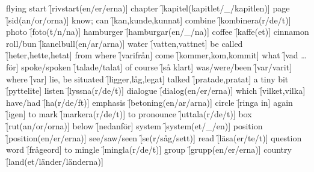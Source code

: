 \begin{questions}
    \begin{multicols}{2}
        \raggedcolumns
        \question flying start \f[rivstart(en/er/erna)]
        \question chapter \f[kapitel(kapitlet/\_/kapitlen)]
        \question page \f[sid(an/or/orna)]
        \question know; can \f[kan,kunde,kunnat]
        \question combine \f[kombinera(r/de/t)]
        \question photo \f[foto(t/n/na)]
        \question hamburger \f[hamburgar(en/\_/na)]
        \question coffee \f[kaffe(et)]
        \question cinnamon roll/bun \f[kanelbull(en/ar/arna)]
        \question water \f[vatten,vattnet]
        \question be called \f[heter,hette,hetat]
        \question from where \f[varifrån]
        \question come \f[kommer,kom,kommit]
        \question what \f[vad \ldots för]
        \question spoke/spoken \f[talade/talat]
        \question of course \f[så klart]
        \question was/were/been \f[var/varit]
        \question where \f[var]
        \question lie, be situated \f[ligger,låg,legat]
        \question talked \f[pratade,pratat]
        \question a tiny bit \f[pyttelite]
        \question listen \f[lyssna(r/de/t)]
        \question dialogue \f[dialog(en/er/erna)]
        \question which \f[vilket,vilka]
        \question have/had \f[ha(r/de/ft)]
        \question emphasis \f[betoning(en/ar/arna)]
        \question circle \f[ringa in]
        \question again \f[igen]
        \question to mark \f[markera(r/de/t)]
        \question to pronounce \f[uttala(r/de/t)]
        \question box \f[rut(an/or/orna)]
        \question below \f[nedanför]
        \question system \f[system(et/\_/en)]
        \question position \f[position(en/er/erna)]
        \question see/saw/seen \f[se(r/såg/sett)]
        \question read \f[läsa(er/te/t)]
        \question question word \f[frågeord]
        \question to mingle \f[mingla(r/de/t)]
        \question group \f[grupp(en/er/erna)]
        \question country \f[land(et/länder/länderna)]
    \end{multicols}
\end{questions}
